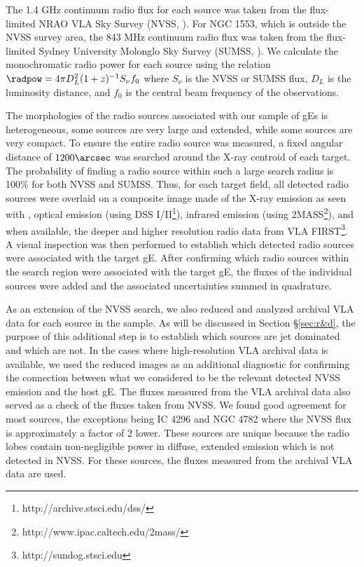 \documentclass{emulateapj}
\begin{document}
The 1.4 GHz continuum radio flux for each source was taken from the
flux-limited NRAO VLA Sky Survey (NVSS, \citealt{nvss}). For NGC 1553,
which is outside the NVSS survey area, the 843 MHz continuum radio
flux was taken from the flux-limited Sydney University Molonglo Sky
Survey (SUMSS, \citealt{sumss1, sumss2}). We calculate the
monochromatic radio power for each source using the relation $\radpow
= 4 \pi D_L^2 (1+z)^{-1} S_{\nu} f_0$ where $S_{\nu}$ is the NVSS or
SUMSS flux, $D_L$ is the luminosity distance, and $f_0$ is the central
beam frequency of the observations.

The morphologies of the radio sources associated with our sample of
gEs is heterogeneous, some sources are very large and extended, while
some sources are very compact. To ensure the entire radio source was
measured, a fixed angular distance of $1200\arcsec$ was searched
around the X-ray centroid of each target. The probability of finding a
radio source within such a large search radius is 100\% for both NVSS
and SUMSS. Thus, for each target field, all detected radio sources
were overlaid on a composite image made of the X-ray emission as seen
with \chandra, optical emission (using DSS
I/II\footnote{http://archive.stsci.edu/dss/}), infrared emission
(using 2MASS\footnote{http://www.ipac.caltech.edu/2mass/}), and when
available, the deeper and higher resolution radio data from VLA
FIRST\footnote{http://sundog.stsci.edu}. A visual inspection was then
performed to establish which detected radio sources were associated
with the target gE. After confirming which radio sources within the
search region were associated with the target gE, the fluxes of the
individual sources were added and the associated uncertainties summed
in quadrature.

As an extension of the NVSS search, we also reduced and analyzed
archival VLA data for each source in the sample. As will be discussed
in Section \S\ref{sec:r&d}, the purpose of this additional step is to
establish which sources are jet dominated and which are not. In the
cases where high-resolution VLA archival data is available, we used
the reduced images as an additional diagnostic for confirming the
connection between what we considered to be the relevant detected NVSS
emission and the host gE. The fluxes measured from the VLA archival
data also served as a check of the fluxes taken from NVSS. We found
good agreement for most sources, the exceptions being IC 4296 and NGC
4782 where the NVSS flux is approximately a factor of 2 lower. These
sources are unique because the radio lobes contain non-negligible
power in diffuse, extended emission which is not detected in NVSS. For
these sources, the fluxes measured from the archival VLA data are
used.
\end{document}

